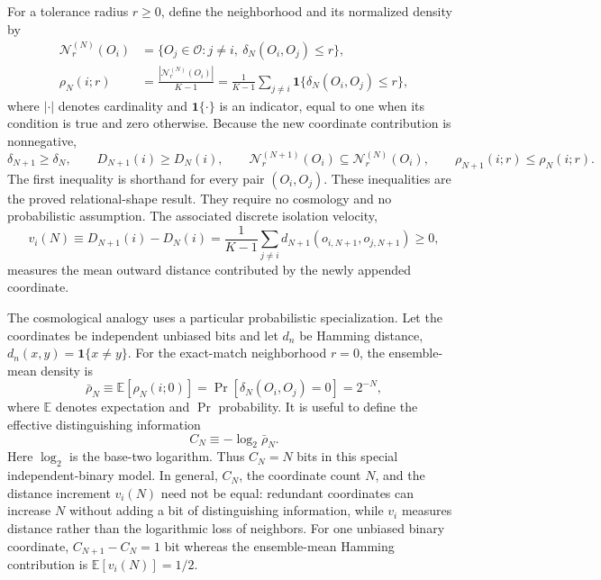 \documentclass[10pt]{article}
\begin{document}
For a tolerance radius $r\geq0$, define the neighborhood and its normalized
density by
\begin{align}
\mathcal N_r^{(N)}(O_i)
&=\{O_j\in\mathcal O:j\ne i,\ \delta_N(O_i,O_j)\leq r\},\\
\rho_N(i;r)
&=\frac{|\mathcal N_r^{(N)}(O_i)|}{K-1}
=\frac{1}{K-1}\sum_{j\ne i}
\mathbf 1\!\{\delta_N(O_i,O_j)\leq r\},
\label{eq:neighborhood-density}
\end{align}
where $|\cdot|$ denotes cardinality and $\mathbf 1\{\cdot\}$ is an indicator,
equal to one when its condition is true and zero otherwise.  Because the new
coordinate contribution is nonnegative,
\begin{equation}
\delta_{N+1}\geq\delta_N,
\qquad D_{N+1}(i)\geq D_N(i),
\qquad
\mathcal N_r^{(N+1)}(O_i)\subseteq\mathcal N_r^{(N)}(O_i),
\qquad \rho_{N+1}(i;r)\leq\rho_N(i;r).
\label{eq:thinning-theorem}
\end{equation}
The first inequality is shorthand for every pair $(O_i,O_j)$.  These
inequalities are the proved relational-shape result.  They require no
cosmology and no probabilistic assumption.  The associated discrete isolation
velocity,
\begin{equation}
v_i(N)\equiv D_{N+1}(i)-D_N(i)
=\frac{1}{K-1}\sum_{j\ne i}
d_{N+1}(o_{i,N+1},o_{j,N+1})\geq0,
\label{eq:isolation-velocity}
\end{equation}
measures the mean outward distance contributed by the newly appended
coordinate.

The cosmological analogy uses a particular probabilistic specialization.  Let
the coordinates be independent unbiased bits and let $d_n$ be Hamming
distance, $d_n(x,y)=\mathbf 1\{x\ne y\}$.  For the exact-match neighborhood
$r=0$, the ensemble-mean density is
\begin{equation}
\bar\rho_N\equiv\mathbb E[\rho_N(i;0)]
=\Pr[\delta_N(O_i,O_j)=0]=2^{-N},
\label{eq:binary-density}
\end{equation}
where $\mathbb E$ denotes expectation and $\Pr$ probability.  It is useful to
define the effective distinguishing information
\begin{equation}
C_N\equiv-\log_2\bar\rho_N.
\label{eq:complexity-information}
\end{equation}
Here $\log_2$ is the base-two logarithm.  Thus $C_N=N$ bits in this special
independent-binary model.  In general,
$C_N$, the coordinate count $N$, and the distance increment $v_i(N)$ need not
be equal: redundant coordinates can increase $N$ without adding a bit of
distinguishing information, while $v_i$ measures distance rather than the
logarithmic loss of neighbors.  For one unbiased binary coordinate,
$C_{N+1}-C_N=1$ bit whereas the ensemble-mean Hamming contribution is
$\mathbb E[v_i(N)]=1/2$.
\end{document}
